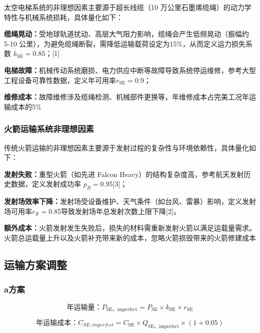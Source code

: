 太空电梯系统的非理想因素主要源于超长线缆（10
万公里石墨烯缆绳）的动力学特性与机械系统损耗，具体量化如下：

\textbf{缆绳晃动：}受地球轨道扰动、高层大气阻力影响，缆绳会产生低频晃动（振幅约
5-10
公里），为避免缆绳断裂，需降低运输载荷设定为15\%，从而定义运力损失系数
\(k_{\text{SE}} = 0.85\)；{[}1{]}

\textbf{电梯故障：}机械传动系统磨损、电力供应中断等故障导致系统停运维修，参考大型工程设备可靠性数据，定义年可用率\(r_{\text{SE}} = 0.\)9；

\textbf{维修成本：}故障维修涉及缆绳检测、机械部件更换等，年维修成本占完美工况年运输成本的5\%

\hypertarget{ux706bux7badux8fd0ux8f93ux7cfbux7edfux975eux7406ux60f3ux56e0ux7d20}{%
\subsubsection{火箭运输系统非理想因素}\label{ux706bux7badux8fd0ux8f93ux7cfbux7edfux975eux7406ux60f3ux56e0ux7d20}}

传统火箭运输的非理想因素主要源于发射过程的复杂性与环境依赖性，具体量化如下：

\textbf{发射失败：}重型火箭（如先进 Falcon
Heavy）的结构复杂度高，参考航天发射历史数据，定义发射成功率
\(p_{R} = 0.\)95{[}3{]}；

\textbf{发射场效率下降：}发射场受设备维护、天气条件（如台风、雷暴）影响，定义发射场可用率\(r_{R} = 0.\)85导致发射场年总发射次数上限下降{[}2{]}。

\textbf{额外成本：}火箭发射发生失败后，损失的材料需重新发射火箭以满足运载量需求。火箭总运载量上升以及火箭补充带来新的成本，忽略火箭损毁带来的火箭修建成本

\hypertarget{ux8fd0ux8f93ux65b9ux6848ux8c03ux6574}{%
\subsection{运输方案调整}\label{ux8fd0ux8f93ux65b9ux6848ux8c03ux6574}}

\hypertarget{aux65b9ux6848}{%
\subsubsection{a方案}\label{aux65b9ux6848}}

\[年运输量：P_{\text{SE}，\text{imperfect}} = P_{\text{SE}} \times k_{\text{SE}} \times r_{\text{SE}}\]

\[年运输成本：C_{SE,imperfect} = C_{\text{SE}} \times Q_{\text{SE}，\text{imperfect}} \times (1 + 0.05)\]

